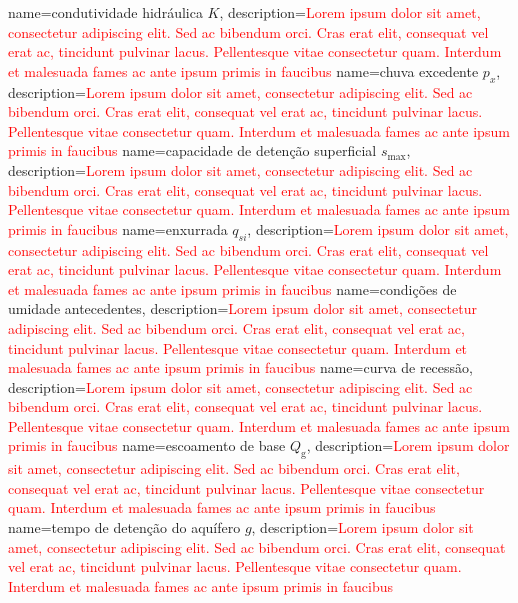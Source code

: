 {
    name=condutividade hidráulica $K$,
    description={\textcolor{red}{Lorem ipsum dolor sit amet, consectetur adipiscing elit. Sed ac bibendum orci. Cras erat elit, consequat vel erat ac, tincidunt pulvinar lacus. Pellentesque vitae consectetur quam. Interdum et malesuada fames ac ante ipsum primis in faucibus}}
}
{
    name=chuva excedente $p_{x}$,
    description={\textcolor{red}{Lorem ipsum dolor sit amet, consectetur adipiscing elit. Sed ac bibendum orci. Cras erat elit, consequat vel erat ac, tincidunt pulvinar lacus. Pellentesque vitae consectetur quam. Interdum et malesuada fames ac ante ipsum primis in faucibus}}
}
{
    name=capacidade de detenção superficial $s_{\text{max}}$,
    description={\textcolor{red}{Lorem ipsum dolor sit amet, consectetur adipiscing elit. Sed ac bibendum orci. Cras erat elit, consequat vel erat ac, tincidunt pulvinar lacus. Pellentesque vitae consectetur quam. Interdum et malesuada fames ac ante ipsum primis in faucibus}}
}
{
    name=enxurrada $q_{si}$,
    description={\textcolor{red}{Lorem ipsum dolor sit amet, consectetur adipiscing elit. Sed ac bibendum orci. Cras erat elit, consequat vel erat ac, tincidunt pulvinar lacus. Pellentesque vitae consectetur quam. Interdum et malesuada fames ac ante ipsum primis in faucibus}}
}
{
    name=condições de umidade antecedentes,
    description={\textcolor{red}{Lorem ipsum dolor sit amet, consectetur adipiscing elit. Sed ac bibendum orci. Cras erat elit, consequat vel erat ac, tincidunt pulvinar lacus. Pellentesque vitae consectetur quam. Interdum et malesuada fames ac ante ipsum primis in faucibus}}
}
{
    name=curva de recessão,
    description={\textcolor{red}{Lorem ipsum dolor sit amet, consectetur adipiscing elit. Sed ac bibendum orci. Cras erat elit, consequat vel erat ac, tincidunt pulvinar lacus. Pellentesque vitae consectetur quam. Interdum et malesuada fames ac ante ipsum primis in faucibus}}
}
{
    name=escoamento de base $Q_{\text{g}}$,
    description={\textcolor{red}{Lorem ipsum dolor sit amet, consectetur adipiscing elit. Sed ac bibendum orci. Cras erat elit, consequat vel erat ac, tincidunt pulvinar lacus. Pellentesque vitae consectetur quam. Interdum et malesuada fames ac ante ipsum primis in faucibus}}
}
{
    name=tempo de detenção do aquífero $g$,
    description={\textcolor{red}{Lorem ipsum dolor sit amet, consectetur adipiscing elit. Sed ac bibendum orci. Cras erat elit, consequat vel erat ac, tincidunt pulvinar lacus. Pellentesque vitae consectetur quam. Interdum et malesuada fames ac ante ipsum primis in faucibus}}
}
